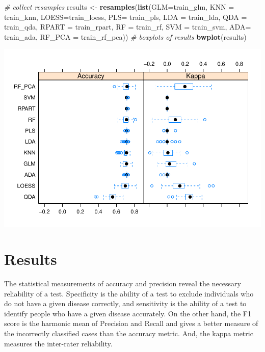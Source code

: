 \documentclass[]{article}
\newenvironment{Shaded}{\begin{snugshade}}{\end{snugshade}}
\newcommand{\CommentTok}[1]{\textcolor[rgb]{0.56,0.35,0.01}{\textit{#1}}}
\newcommand{\DataTypeTok}[1]{\textcolor[rgb]{0.13,0.29,0.53}{#1}}
\newcommand{\KeywordTok}[1]{\textcolor[rgb]{0.13,0.29,0.53}{\textbf{#1}}}
\newcommand{\NormalTok}[1]{#1}
\newcommand{\StringTok}[1]{\textcolor[rgb]{0.31,0.60,0.02}{#1}}
\begin{document}
\begin{Shaded}
\begin{Highlighting}[]
\CommentTok{# collect resamples}
\NormalTok{results <-}\StringTok{ }\KeywordTok{resamples}\NormalTok{(}\KeywordTok{list}\NormalTok{(}\DataTypeTok{GLM=}\NormalTok{train_glm, }
                          \DataTypeTok{KNN =}\NormalTok{ train_knn,}
                          \DataTypeTok{LOESS=}\NormalTok{train_loess,}
                          \DataTypeTok{PLS=}\NormalTok{ train_pls,}
                          \DataTypeTok{LDA =}\NormalTok{ train_lda,}
                          \DataTypeTok{QDA =}\NormalTok{ train_qda,}
                          \DataTypeTok{RPART =}\NormalTok{ train_rpart,}
                          \DataTypeTok{RF =}\NormalTok{ train_rf,}
                          \DataTypeTok{SVM =}\NormalTok{ train_svm,}
                          \DataTypeTok{ADA=}\NormalTok{ train_ada,}
                          \DataTypeTok{RF_PCA =}\NormalTok{ train_rf_pca))}
\CommentTok{# boxplots of results}
\KeywordTok{bwplot}\NormalTok{(results)}
\end{Highlighting}
\end{Shaded}

\includegraphics{LiverDisease_files/figure-latex/unnamed-chunk-37-1.pdf}

\section{Results}
\label{sec:results}

The statistical measurements of accuracy and precision reveal the
necessary reliability of a test. Specificity is the ability of a test to
exclude individuals who do not have a given disease correctly, and
sensitivity is the ability of a test to identify people who have a given
disease accurately. On the other hand, the F1 score is the harmonic mean
of Precision and Recall and gives a better measure of the incorrectly
classified cases than the accuracy metric. And, the kappa metric
measures the inter-rater reliability.
\end{document}
